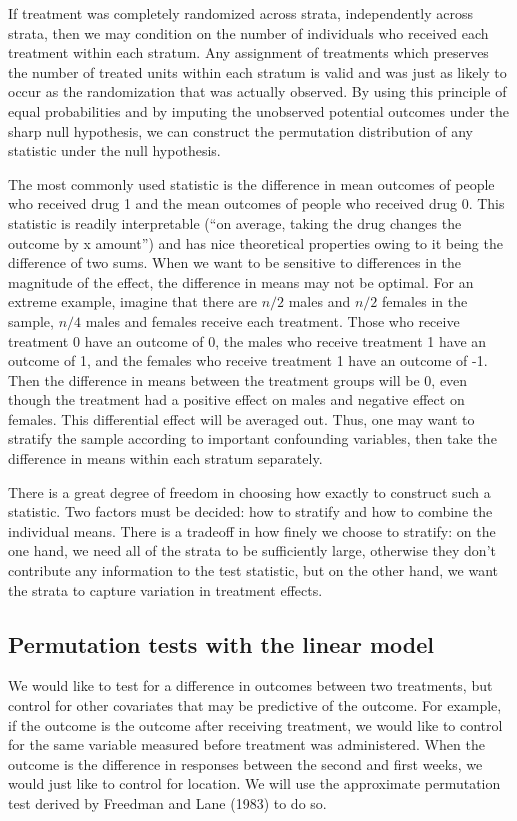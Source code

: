\documentclass[11pt]{article}
\newcommand{\todo}[1]{{\color{red}{TO DO: \sc #1}}}
\begin{document}
If treatment was completely randomized across strata, independently across strata,
then we may condition on the number of individuals who received each treatment within each stratum.
Any assignment of treatments which preserves the number of treated units within each stratum is valid and was just as likely to occur as the randomization that was actually observed.
By using this principle of equal probabilities and by imputing the unobserved potential outcomes under the sharp null hypothesis, we can construct the permutation distribution of any statistic under the null hypothesis.

The most commonly used statistic is the difference in mean outcomes of people who received drug 1 and the mean outcomes of people who received drug 0.  This statistic is readily interpretable (``on average, taking the drug changes the outcome by x amount'') and has nice theoretical properties owing to it being the difference of two sums.
When we want to be sensitive to differences in the magnitude of the effect, the difference in means may not be optimal.  For an extreme example, imagine that there are $n/2$ males and $n/2$ females in the sample, $n/4$ males and females receive each treatment.  Those who receive treatment 0 have an outcome of 0, the males who receive treatment 1 have an outcome of 1, and the females who receive treatment 1 have an outcome of -1.  Then the difference in means between the treatment groups will be $0$, even though the treatment had a positive effect on males and negative effect on females.  This differential effect will be averaged out.
Thus, one may want to stratify the sample according to important confounding variables, then take the difference in means within each stratum separately. 

There is a great degree of freedom in choosing how exactly to construct such a statistic.
Two factors must be decided: how to stratify and how to combine the individual means.
There is a tradeoff in how finely we choose to stratify:
on the one hand, we need all of the strata to be sufficiently large, otherwise they don't contribute any information to the test statistic,
 but on the other hand, we want the strata to capture variation in treatment effects.
\todo{discussion of NPC and cite papers}


\subsection{Permutation tests with the linear model}
We would like to test for a difference in outcomes between two treatments, but control for other covariates that may be predictive of the outcome.
For example, if the outcome is the outcome after receiving treatment, we would like to control for the same variable measured before treatment was administered.
When the outcome is the difference in responses between the second and first weeks, we would just like to control for location.
We will use the approximate permutation test derived by Freedman and Lane (1983) to do so.
\end{document}
